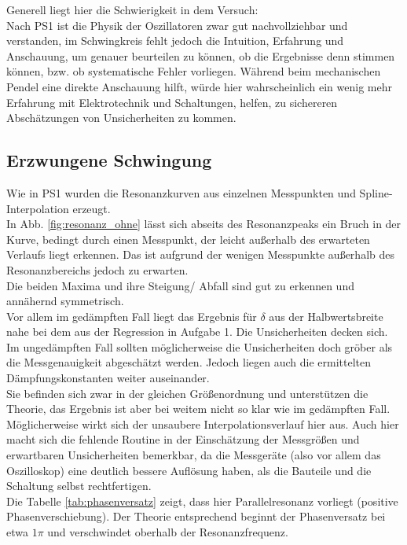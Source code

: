 \documentclass[12pt,a4paper]{article}
\begin{document}
\begin{multicols}{2}
\noindent Generell liegt hier die Schwierigkeit in dem Versuch:\\
Nach PS1 ist die Physik der Oszillatoren zwar gut nachvollziehbar und verstanden, im Schwingkreis fehlt jedoch die Intuition, Erfahrung und Anschauung, um genauer beurteilen zu können, ob die Ergebnisse denn stimmen können, bzw. ob systematische Fehler vorliegen. Während beim mechanischen Pendel eine direkte Anschauung hilft, würde hier wahrscheinlich ein wenig mehr Erfahrung mit Elektrotechnik und Schaltungen, helfen, zu sichereren Abschätzungen von Unsicherheiten zu kommen.

\subsection{Erzwungene Schwingung}
Wie in PS1 wurden die Resonanzkurven aus einzelnen Messpunkten und Spline-Interpolation erzeugt.\\
In Abb. \ref{fig:resonanz_ohne} lässt sich abseits des Resonanzpeaks ein Bruch in der Kurve, bedingt durch einen Messpunkt, der leicht außerhalb des erwarteten Verlaufs liegt erkennen. Das ist aufgrund der wenigen Messpunkte außerhalb des Resonanzbereichs jedoch zu erwarten.\\
Die beiden Maxima und ihre Steigung/ Abfall sind gut zu erkennen und annähernd symmetrisch.\\

\noindent Vor allem im gedämpften Fall liegt das Ergebnis für $\delta$ aus der Halbwertsbreite nahe bei dem aus der Regression in Aufgabe 1. Die Unsicherheiten decken sich.\\
Im ungedämpften Fall sollten möglicherweise die Unsicherheiten doch gröber als die Messgenauigkeit abgeschätzt werden. Jedoch liegen auch die ermittelten Dämpfungskonstanten weiter auseinander.\\
Sie befinden sich zwar in der gleichen Größenordnung und unterstützen die Theorie, das Ergebnis ist aber bei weitem nicht so klar wie im gedämpften Fall.\\
Möglicherweise wirkt sich der unsaubere Interpolationsverlauf hier aus. Auch hier macht sich die fehlende Routine in der Einschätzung der Messgrößen und erwartbaren Unsicherheiten bemerkbar, da die Messgeräte (also vor allem das Oszilloskop) eine deutlich bessere Auflösung haben, als die Bauteile und die Schaltung selbst rechtfertigen.\\

\noindent Die Tabelle \ref{tab:phasenversatz} zeigt, dass hier Parallelresonanz vorliegt (positive Phasenverschiebung). Der Theorie entsprechend beginnt der Phasenversatz bei etwa $1 \pi$ und verschwindet oberhalb der Resonanzfrequenz.


\end{multicols}
\end{document}
